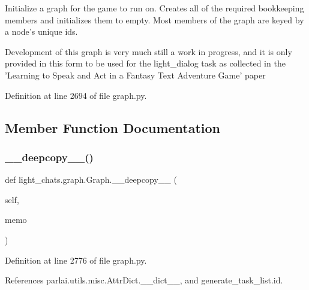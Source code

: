 \begin{DoxyVerb}Initialize a graph for the game to run on. Creates all of the
required bookkeeping members and initializes them to empty. Most
members of the graph are keyed by a node's unique ids.

Development of this graph is very much still a work in progress,
and it is only provided in this form to be used for the light_dialog
task as collected in the 'Learning to Speak and Act in a Fantasy
Text Adventure Game' paper
\end{DoxyVerb}
 

Definition at line 2694 of file graph.\+py.



\subsection{Member Function Documentation}
\mbox{\label{classlight__chats_1_1graph_1_1Graph_a1fc2b40195b1c7d3ed3a26dbd26fe79b}} 
\subsubsection{\texorpdfstring{\+\_\+\+\_\+deepcopy\+\_\+\+\_\+()}{\_\_deepcopy\_\_()}}
{\footnotesize\ttfamily def light\+\_\+chats.\+graph.\+Graph.\+\_\+\+\_\+deepcopy\+\_\+\+\_\+ (\begin{DoxyParamCaption}\item[{}]{self,  }\item[{}]{memo }\end{DoxyParamCaption})}



Definition at line 2776 of file graph.\+py.



References parlai.\+utils.\+misc.\+Attr\+Dict.\+\_\+\+\_\+dict\+\_\+\+\_\+, and generate\+\_\+task\+\_\+list.\+id.

\mbox{\label{classlight__chats_1_1graph_1_1Graph_a56d79ef43ac8f25d399228cc57f5fa25}} 
